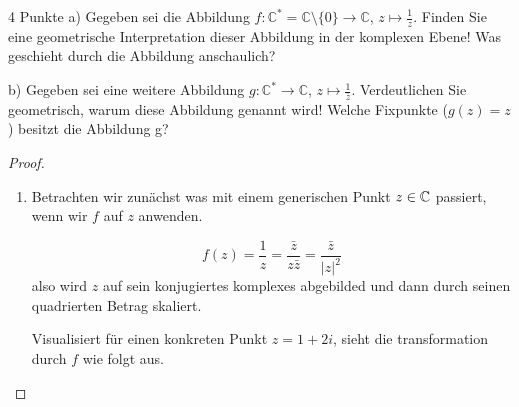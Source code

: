 \documentclass{problemset}
\begin{document}
\begin{problem}[Einheitskreis]{4 Punkte}
a) Gegeben sei die Abbildung $f : \mathbb{C}^* = \mathbb{C} \setminus \{0\} \rightarrow \mathbb{C}$, $z \mapsto \frac{1}{z}$. Finden Sie eine geometrische Interpretation dieser Abbildung in der komplexen Ebene! Was geschieht durch die Abbildung anschaulich?

b) Gegeben sei eine weitere Abbildung $g : \mathbb{C}^* \rightarrow
    \mathbb{C}$, $z \mapsto \frac{1}{\overline{z}}$. Verdeutlichen Sie geometrisch,
warum diese Abbildung  genannt
wird! Welche Fixpunkte ($g(z) = z$) besitzt die Abbildung g?

\begin{proof}
    \leavevmode
    \begin{enumerate}
        \item Betrachten wir zunächst was mit einem generischen Punkt $z \in \mathbb{C}$
              passiert, wenn wir $f$ auf $z$ anwenden.

              \[
                  f(z) = \frac{1}{z} = \frac{\bar{z}}{z \bar{z}} = \frac{\bar{z}}{{|z|}^2}
              \] also wird $z$ auf sein konjugiertes komplexes abgebilded und dann durch seinen
              quadrierten Betrag skaliert.

              Visualisiert für einen konkreten Punkt $z = 1 + 2i$, sieht die transformation
              durch $f$ wie folgt aus.

              \begin{center}
              \end{center}


\end{enumerate}
\end{proof}
\end{problem}
\end{document}
